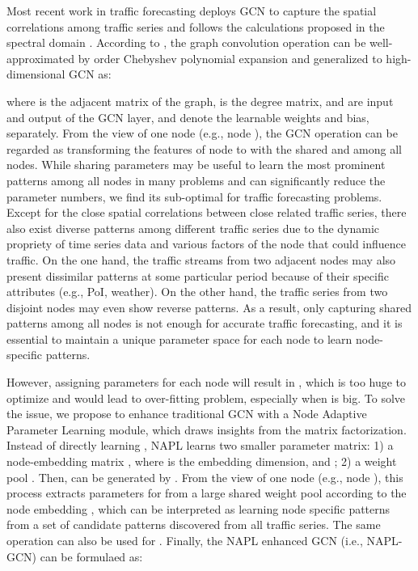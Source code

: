 \documentclass{article}
\begin{document}
Most recent work in traffic forecasting deploys GCN to capture the spatial correlations among traffic series and follows the calculations proposed in the spectral domain \cite{gcn-defferrard,kipf-gcn}. According to \cite{kipf-gcn}, the graph convolution operation can be well-approximated by  order Chebyshev polynomial expansion and generalized to high-dimensional GCN as:

where  is the adjacent matrix of the graph,  is the degree matrix,  and  are input and output of the GCN layer,  and  denote the learnable weights and bias, separately.
From the view of one node (e.g., node ), the GCN operation can be regarded as transforming the features of node  to  with the shared  and  among all nodes. While sharing parameters may be useful to learn the most prominent patterns among all nodes in many problems and can significantly reduce the parameter numbers, we find its sub-optimal for traffic forecasting problems. 
Except for the close spatial correlations between close related traffic series, there also exist diverse patterns among different traffic series due to the dynamic propriety of time series data and various factors of the node that could influence traffic.
On the one hand, the traffic streams from two adjacent nodes may also present dissimilar patterns at some particular period because of their specific attributes (e.g., PoI, weather). On the other hand, the traffic series from two disjoint nodes may even show reverse patterns.
As a result, only capturing shared patterns among all nodes is not enough for accurate traffic forecasting, and it is essential to maintain a unique parameter space for each node to learn node-specific patterns. 

However, assigning parameters for each node will result in , which is too huge to optimize and would lead to over-fitting problem, especially when  is big. To solve the issue, we propose to enhance traditional GCN with a Node Adaptive Parameter Learning module, which draws insights from the matrix factorization. Instead of directly learning , NAPL learns two smaller parameter matrix: 1) a node-embedding matrix , where  is the embedding dimension, and ; 2) a weight pool . Then,  can be generated by . From the view of one node (e.g., node ), this process extracts parameters  for  from a large shared weight pool  according to the node embedding , which can be interpreted as learning node specific patterns from a set of candidate patterns discovered from all traffic series. The same operation can also be used for . Finally, the NAPL enhanced GCN (i.e., NAPL-GCN) can be formulaed as:
\end{document}
